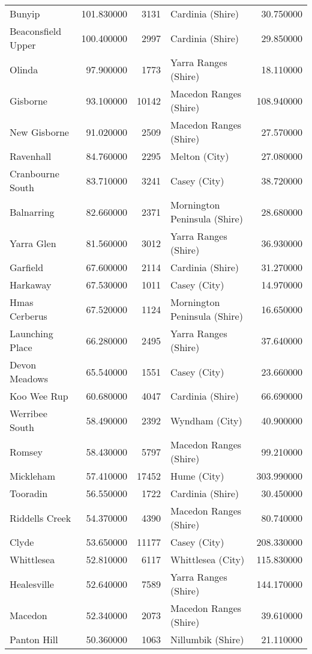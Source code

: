 \begin{table}
\begin{tabular}{lrrlr}
Bunyip & 101.830000 & 3131 & Cardinia (Shire) & 30.750000 \\
Beaconsfield Upper & 100.400000 & 2997 & Cardinia (Shire) & 29.850000 \\
Olinda & 97.900000 & 1773 & Yarra Ranges (Shire) & 18.110000 \\
Gisborne & 93.100000 & 10142 & Macedon Ranges (Shire) & 108.940000 \\
New Gisborne & 91.020000 & 2509 & Macedon Ranges (Shire) & 27.570000 \\
Ravenhall & 84.760000 & 2295 & Melton (City) & 27.080000 \\
Cranbourne South & 83.710000 & 3241 & Casey (City) & 38.720000 \\
Balnarring & 82.660000 & 2371 & Mornington Peninsula (Shire) & 28.680000 \\
Yarra Glen & 81.560000 & 3012 & Yarra Ranges (Shire) & 36.930000 \\
Garfield & 67.600000 & 2114 & Cardinia (Shire) & 31.270000 \\
Harkaway & 67.530000 & 1011 & Casey (City) & 14.970000 \\
Hmas Cerberus & 67.520000 & 1124 & Mornington Peninsula (Shire) & 16.650000 \\
Launching Place & 66.280000 & 2495 & Yarra Ranges (Shire) & 37.640000 \\
Devon Meadows & 65.540000 & 1551 & Casey (City) & 23.660000 \\
Koo Wee Rup & 60.680000 & 4047 & Cardinia (Shire) & 66.690000 \\
Werribee South & 58.490000 & 2392 & Wyndham (City) & 40.900000 \\
Romsey & 58.430000 & 5797 & Macedon Ranges (Shire) & 99.210000 \\
Mickleham & 57.410000 & 17452 & Hume (City) & 303.990000 \\
Tooradin & 56.550000 & 1722 & Cardinia (Shire) & 30.450000 \\
Riddells Creek & 54.370000 & 4390 & Macedon Ranges (Shire) & 80.740000 \\
Clyde & 53.650000 & 11177 & Casey (City) & 208.330000 \\
Whittlesea & 52.810000 & 6117 & Whittlesea (City) & 115.830000 \\
Healesville & 52.640000 & 7589 & Yarra Ranges (Shire) & 144.170000 \\
Macedon & 52.340000 & 2073 & Macedon Ranges (Shire) & 39.610000 \\
Panton Hill & 50.360000 & 1063 & Nillumbik (Shire) & 21.110000 \\

\end{tabular}
\end{table}
